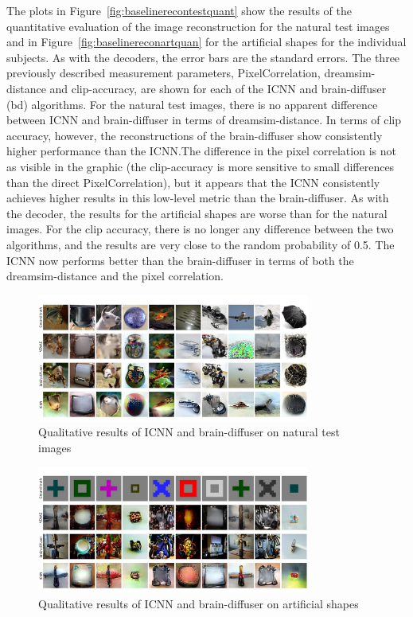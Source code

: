 The plots in Figure~\ref{fig:baselinerecontestquant} show the results of the quantitative evaluation of the image reconstruction for the natural test images and in Figure~\ref{fig:baselinereconartquan} for the artificial shapes for the individual subjects. As with the decoders, the error bars are the standard errors. The three previously described measurement parameters, PixelCorrelation, dreamsim-distance and clip-accuracy, are shown for each of the ICNN and brain-diffuser (bd) algorithms. 
For the natural test images, there is no apparent difference between ICNN and brain-diffuser in terms of dreamsim-distance. In terms of clip accuracy, however, the reconstructions of the brain-diffuser show consistently higher performance than the ICNN.\@ The difference in the pixel correlation is not as visible in the graphic (the clip-accuracy is more sensitive to small differences than the direct PixelCorrelation), but it appears that the ICNN consistently achieves higher results in this low-level metric than the brain-diffuser. As with the decoder, the results for the artificial shapes are worse than for the natural images. For the clip accuracy, there is no longer any difference between the two algorithms, and the results are very close to the random probability of 0.5. The ICNN now performs better than the brain-diffuser in terms of both the dreamsim-distance and the pixel correlation. 


\begin{figure}[ht]
    \centering
    \includegraphics[width=0.8\textwidth]{plots/baseline_qual_recon_test.JPEG}
    \caption{Qualitative results of ICNN and brain-diffuser on natural test images}\label{fig:baselinerecontestqual}
\end{figure}

\begin{figure}[ht]
    \centering
    \includegraphics[width=0.8\textwidth]{plots/baseline_qual_recon_art.JPEG}
    \caption{Qualitative results of ICNN and brain-diffuser on artificial shapes}\label{fig:baselinereconartqual}
\end{figure}


